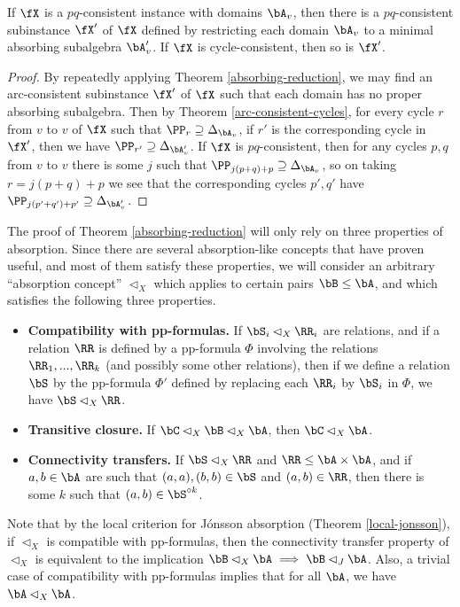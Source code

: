 \begin{thm}\label{absorbing-pq} If $\fX$ is a $pq$-consistent instance with domains $\bA_v$, then there is a $pq$-consistent subinstance $\fX'$ of $\fX$ defined by restricting each domain $\bA_v$ to a minimal absorbing subalgebra $\bA_v'$. If $\fX$ is cycle-consistent, then so is $\fX'$.
\end{thm}
\begin{proof} By repeatedly applying Theorem \ref{absorbing-reduction}, we may find an arc-consistent subinstance $\fX'$ of $\fX$ such that each domain has no proper absorbing subalgebra. Then by Theorem \ref{arc-consistent-cycles}, for every cycle $r$ from $v$ to $v$ of $\fX$ such that $\PP_r \supseteq \Delta_{\bA_v}$, if $r'$ is the corresponding cycle in $\fX'$, then we have $\PP_{r'} \supseteq \Delta_{\bA_v'}$. If $\fX$ is $pq$-consistent, then for any cycles $p,q$ from $v$ to $v$ there is some $j$ such that $\PP_{j(p+q)+p} \supseteq \Delta_{\bA_v}$, so on taking $r = j(p+q)+p$ we see that the corresponding cycles $p',q'$ have $\PP_{j(p'+q')+p'} \supseteq \Delta_{\bA_v'}$.
\end{proof}

The proof of Theorem \ref{absorbing-reduction} will only rely on three properties of absorption. Since there are several absorption-like concepts that have proven useful, and most of them satisfy these properties, we will consider an arbitrary ``absorption concept'' $\lhd_X$ which applies to certain pairs $\bB \le \bA$, and which satisfies the following three properties.
\begin{itemize}
\item {\bf Compatibility with pp-formulas.} If $\bS_i \lhd_X \RR_i$ are relations, and if a relation $\RR$ is defined by a pp-formula $\Phi$ involving the relations $\RR_1, ..., \RR_k$ (and possibly some other relations), then if we define a relation $\bS$ by the pp-formula $\Phi'$ defined by replacing each $\RR_i$ by $\bS_i$ in $\Phi$, we have $\bS \lhd_X \RR$.

\item {\bf Transitive closure.} If $\bC \lhd_X \bB \lhd_X \bA$, then $\bC \lhd_X \bA$.

\item {\bf Connectivity transfers.} If $\bS \lhd_X \RR$ and $\RR \le \bA \times \bA$, and if $a,b \in \bA$ are such that $(a,a), (b,b) \in \bS$ and $(a,b) \in \RR$, then there is some $k$ such that $(a,b) \in \bS^{\circ k}$.
\end{itemize}
Note that by the local criterion for J\'onsson absorption (Theorem \ref{local-jonsson}), if $\lhd_X$ is compatible with pp-formulas, then the connectivity transfer property of $\lhd_X$ is equivalent to the implication $\bB \lhd_X \bA \implies \bB \lhd_J \bA$. Also, a trivial case of compatibility with pp-formulas implies that for all $\bA$, we have $\bA \lhd_X \bA$.


